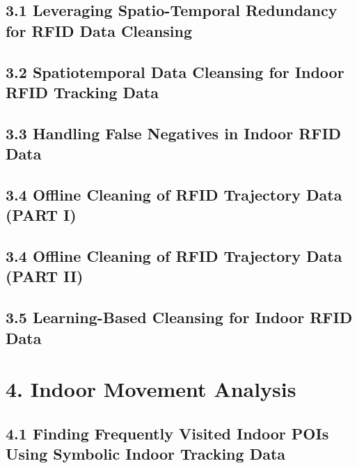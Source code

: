 \documentclass{beamer}
\begin{document}
\subsection{3.1 Leveraging Spatio-Temporal Redundancy for RFID Data Cleansing}

% 
% 

\subsection{3.2 Spatiotemporal Data Cleansing for Indoor RFID Tracking Data}

% 
% 

\subsection{3.3 Handling False Negatives in Indoor RFID Data}

% 
% 

\subsection{3.4 Offline Cleaning of RFID Trajectory Data (PART I)}

% 
% 

\subsection{3.4 Offline Cleaning of RFID Trajectory Data (PART II)}

% 
% 

\subsection{3.5 Learning-Based Cleansing for Indoor RFID Data}

% 
% 

\section{4. Indoor Movement Analysis}

\subsection{4.1 Finding Frequently Visited Indoor POIs Using Symbolic Indoor Tracking Data}
\end{document}
